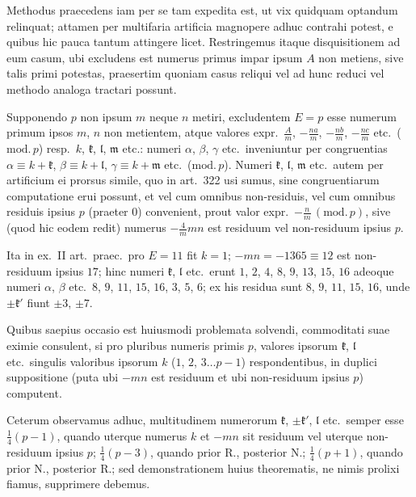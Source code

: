 \documentclass[12pt,a4paper]{article}
\theoremstyle{plain}
\theoremstyle{definition}
\theoremstyle{remark}
\begin{document}
Methodus praecedens iam per se tam expedita est, ut vix quidquam optandum relinquat; attamen per multifaria artificia magnopere adhuc contrahi potest, e quibus hic pauca tantum attingere licet. Restringemus itaque disquisitionem ad eum casum, ubi excludens est numerus primus impar ipsum $A$ non metiens, sive talis primi potestas, praesertim quoniam casus reliqui vel ad hunc reduci vel methodo analoga tractari possunt.

Supponendo $p$ non ipsum $m$ neque $n$ metiri, excludentem $E=p$ esse numerum primum ipsos $m$, $n$ non metientem, atque valores expr.~$\frac{A}{m}$, $-\frac{na}{m}$, $-\frac{nb}{m}$, $-\frac{nc}{m}$ etc.\ ($\mathrm{mod.}\,p$) resp.\ $k$, $\mathfrak{k}$, $\mathfrak{l}$, $\mathfrak{m}$ etc.: numeri $\alpha$, $\beta$, $\gamma$ etc.\ inveniuntur per congruentias $\alpha\equiv k+\mathfrak{k}$, $\beta\equiv k+\mathfrak{l}$, $\gamma\equiv k+\mathfrak{m}$ etc.\ ($\mathrm{mod.}\,p$). Numeri $\mathfrak{k}$, $\mathfrak{l}$, $\mathfrak{m}$ etc.\ autem per artificium ei prorsus simile, quo in art.\ 322 usi sumus, sine congruentiarum computatione erui possunt, et vel cum omnibus non-residuis, vel cum omnibus residuis ipsius $p$ (praeter $0$) convenient, prout valor expr.~$-\frac{n}{m}\,(\mathrm{mod.}\,p)$, sive (quod hic eodem redit) numerus $-\frac{4}{m}mn$ est residuum vel non-residuum ipsius $p$.

Ita in ex.\ II art.\ praec.\ pro $E=11$ fit $k=1$; $-mn=-1365\equiv 12$ est non-residuum ipsius $17$; hinc numeri $\mathfrak{k}$, $\mathfrak{l}$ etc.\ erunt $1$, $2$, $4$, $8$, $9$, $13$, $15$, $16$ adeoque numeri $\alpha$, $\beta$ etc.\ $8$, $9$, $11$, $15$, $16$, $3$, $5$, $6$; ex his residua sunt $8$, $9$, $11$, $15$, $16$, unde $\pm\mathfrak{k}'$ fiunt $\pm 3$, $\pm 7$.

Quibus saepius occasio est huiusmodi problemata solvendi, commoditati suae eximie consulent, si pro pluribus numeris primis $p$, valores ipsorum $\mathfrak{k}$, $\mathfrak{l}$ etc.\ singulis valoribus ipsorum $k$ ($1$, $2$, $3\ldots p-1$) respondentibus, in duplici suppositione (puta ubi $-mn$ est residuum et ubi non-residuum ipsius $p$) computent.

Ceterum observamus adhuc, multitudinem numerorum $\mathfrak{k}$, $\pm\mathfrak{k}'$, $\mathfrak{l}$ etc.\ semper esse $\frac{1}{4}(p-1)$, quando uterque numerus $k$ et $-mn$ sit residuum vel uterque non-residuum ipsius $p$; $\frac{1}{4}(p-3)$, quando prior R., posterior N.; $\frac{1}{4}(p+1)$, quando prior N., posterior R.; sed demonstrationem huius theorematis, ne nimis prolixi fiamus, supprimere debemus.
\end{document}
